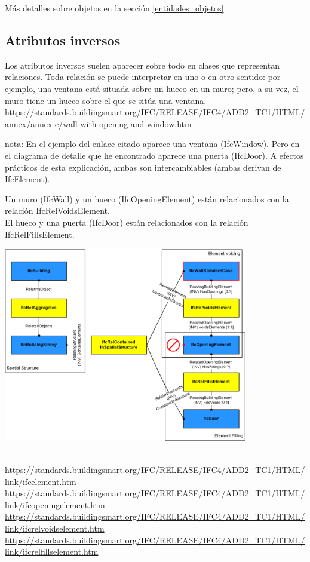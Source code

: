 \documentclass[spanish,12pt,a4paper,final,oneside]{book}
\begin{document}
\vspace{0.5cm}
Más detalles sobre objetos en la sección \ref{entidades_objetos}


\subsection{Atributos inversos} \label{atributos_inversos}

Los atributos inversos suelen aparecer sobre todo en clases que representan relaciones. Toda relación se puede interpretar en uno o en otro sentido: por ejemplo, una ventana está situada sobre un hueco en un muro; pero, a su vez, el muro tiene un hueco sobre el que se sitúa una ventana.
\\ \url{https://standards.buildingsmart.org/IFC/RELEASE/IFC4/ADD2_TC1/HTML/annex/annex-e/wall-with-opening-and-window.htm}

\begin{footnotesize}
nota: En el ejemplo del enlace citado aparece una ventana (IfcWindow). Pero en el diagrama de detalle que he encontrado aparece una puerta (IfcDoor). A efectos prácticos de esta explicación, ambas son intercambiables (ambas derivan de IfcElement). 

\end{footnotesize}
Un muro (IfcWall) y un hueco (IfcOpeningElement) están relacionados con la relación IfcRelVoidsElement.
\\El hueco y una puerta (IfcDoor) están relacionados con la relación IfcRelFillsElement.

\includegraphics[width=0.8\textwidth]{ifcrelfillselements-fig1}
\begin{footnotesize}
\\ \url{https://standards.buildingsmart.org/IFC/RELEASE/IFC4/ADD2_TC1/HTML/link/ifcelement.htm}
\\ \url{https://standards.buildingsmart.org/IFC/RELEASE/IFC4/ADD2_TC1/HTML/link/ifcopeningelement.htm}
\\ \url{https://standards.buildingsmart.org/IFC/RELEASE/IFC4/ADD2_TC1/HTML/link/ifcrelvoidselement.htm}
\\ \url{https://standards.buildingsmart.org/IFC/RELEASE/IFC4/ADD2_TC1/HTML/link/ifcrelfillselement.htm}
\end{footnotesize}
\end{document}
